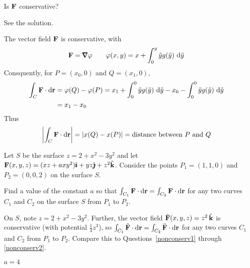 \begin{hint} 
Is $\mathbf{F}$ conservative?
\end{hint}

\begin{answer} 
See the solution.
\end{answer}

\begin{solution} 
The vector field $\mathbf{F}$ is conservative, with 
\begin{equation*}
\vF=\vnabla\varphi\qquad
\varphi(x,y) = x+ \int_0^y \tilde y g(\tilde y)\ \dee{\tilde y}
\end{equation*}
Consquently, for $P=(x_0,0)$ and $Q=(x_1,0)$,
\begin{align*}
\int_C\mathbf{F}\cdot\mathrm{d}\mathbf{r}
&=\varphi(Q)-\varphi(P)
=x_1 + \int_0^{0} \tilde y g(\tilde y)\ \mathrm{d}\tilde y
- x_0 - \int_0^{0} \tilde y g(\tilde y)\ \mathrm{d}\tilde y \\
&=x_1-x_0
\end{align*}
Thus
\begin{equation*}
 \left|\int_C\mathbf{F}\cdot\mathrm{d}\mathbf{r}\right|
=|x(Q)-x(P)|
= \text{distance between $P$ and $Q$}
\end{equation*}

\end{solution}
\begin{question}[M317 2010A] %
Let $S$ be the surface $z = 2 + x^2 - 3 y^2$ and let
$\mathbf{F}(x , y , z) = ( xz + axy^2 )\hat{\pmb{\imath}} + yz\hat{\pmb{\jmath}} + z^2\hat{\mathbf{k}}$.
Consider the points $P_1 = ( 1 , 1 , 0 )$ and $P_2 = ( 0 , 0 , 2 )$ 
on the surface $S$. 

Find a value of the constant $a$ so that
$\int_{C_1} \mathbf{F} \cdot \mathrm{d}\mathbf{r}= \int_{C_2} \mathbf{F} \cdot \mathrm{d}\mathbf{r}$
for any two curves $C_1$ and $C_2$ on the surface $S$ from $P_1$ to $P_2$.
\end{question}

\begin{hint} 
On $S$, note
$z = 2 + x^2 - 3 y^2$. Further, the vector field $\tilde{\mathbf{F}}(x,y,z) = z^2\,\hat{\mathbf{k}}$ is 
conservative (with potential $\frac{1}{3} z^3$), so 
$\int_{C_1} \tilde{\mathbf{F}} \cdot \mathrm{d}\mathbf{r}= \int_{C_2} \tilde{\mathbf{F}} \cdot \mathrm{d}\mathbf{r}$
for any two curves $C_1$ and $C_2$ from $P_1$ to $P_2$. Compare this to Questions~\ref{nonconserv1} through \ref{nonconserv2}.
\end{hint}

\begin{answer} 
$a=4$
\end{answer}

